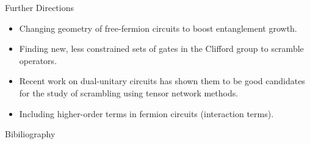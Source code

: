 
\begin{frame}{Further Directions}
    \begin{itemize}
        \item Changing geometry of free-fermion circuits to boost entanglement growth. 
        \item Finding new, less constrained sets of gates in the Clifford group to scramble operators.
        \item Recent work on dual-unitary circuits has shown them to be good candidates for the study of scrambling using tensor network methods. 
        \item Including higher-order terms in fermion circuits (interaction terms). 
    \end{itemize}
    
\end{frame}

\begin{frame}{Bibiliography}
    
    
\end{frame}
